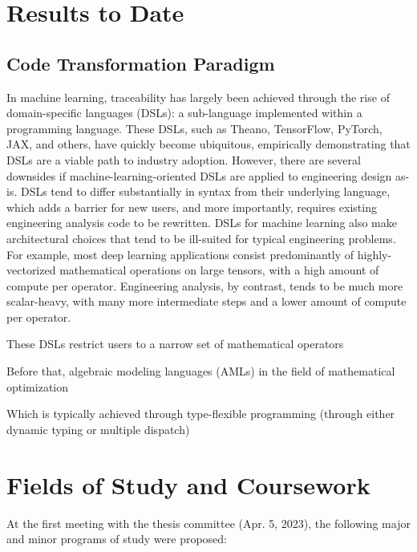 \documentclass[12pt,vi,oneside]{report}
\begin{document}
    \section{Results to Date}
    \label{sec:results}

    \subsection{Code Transformation Paradigm}


    In machine learning, traceability has largely been achieved through the rise of domain-specific languages (DSLs): a sub-language implemented within a programming language. These DSLs, such as Theano, TensorFlow, PyTorch, JAX, and others, have quickly become ubiquitous, empirically demonstrating that DSLs are a viable path to industry adoption. However, there are several downsides if machine-learning-oriented DSLs are applied to engineering design as-is. DSLs tend to differ substantially in syntax from their underlying language, which adds a barrier for new users, and more importantly, requires existing engineering analysis code to be rewritten. DSLs for machine learning also make architectural choices that tend to be ill-suited for typical engineering problems. For example, most deep learning applications consist predominantly of highly-vectorized mathematical operations on large tensors, with a high amount of compute per operator. Engineering analysis, by contrast, tends to be much more scalar-heavy, with many more intermediate steps and a lower amount of compute per operator.


    These DSLs restrict users to a narrow set of mathematical operators

    Before that, algebraic modeling languages (AMLs) in the field of mathematical optimization

    Which is typically achieved through type-flexible programming (through either dynamic typing or multiple dispatch)


    \section{Fields of Study and Coursework}

    At the first meeting with the thesis committee (Apr. 5, 2023), the following major and minor programs of study were proposed:
\end{document}
